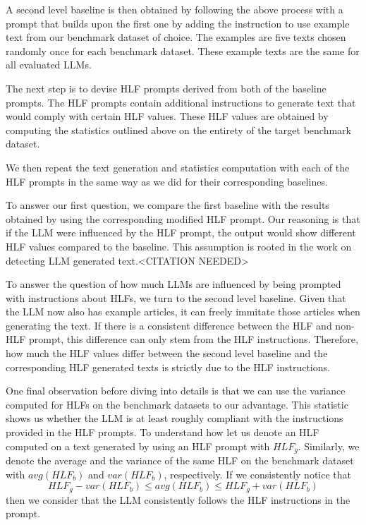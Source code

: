 \documentclass[runningheads,a4paper,11pt]{article}
\begin{document}
A second level baseline is then obtained by following the above process with a
prompt that builds upon the first one by adding the instruction to use example
text from our benchmark dataset of choice.
The examples are five texts chosen randomly once for each benchmark dataset.
These example texts are the same for all evaluated LLMs.

The next step is to devise HLF prompts derived from both of the baseline
prompts.
The HLF prompts contain additional instructions to generate text that would
comply with certain HLF values.
These HLF values are obtained by computing the statistics outlined above on
the entirety of the target benchmark dataset.

We then repeat the text generation and statistics computation with each of the
HLF prompts in the same way as we did for their corresponding baselines.

To answer our first question, we compare the first baseline with the results
obtained by using the corresponding modified HLF prompt.
Our reasoning is that if the LLM were influenced by the HLF prompt, the output
would show different HLF values compared to the baseline.
This assumption is rooted in the work on detecting LLM generated text.<CITATION NEEDED>

To answer the question of how much LLMs are influenced by being prompted with
instructions about HLFs, we turn to the second level baseline.
Given that the LLM now also has example articles, it can freely immitate those
articles when generating the text.
If there is a consistent difference between the HLF and non-HLF prompt, this
difference can only stem from the HLF instructions.
Therefore, how much the HLF values differ between the second level baseline and
the corresponding HLF generated texts is strictly due to the HLF instructions.

One final observation before diving into details is that we can use the variance
computed for HLFs on the benchmark datasets to our advantage.
This statistic shows us whether the LLM is at least roughly compliant with the
instructions provided in the HLF prompts.
To understand how let us denote an HLF computed on a text generated by using an
HLF prompt with $HLF_g$.
Similarly, we denote the average and the variance of the same HLF on the
benchmark dataset with $avg(HLF_b)$ and $var(HLF_b)$, respectively.
If we consistently notice that
    \[HLF_g - var(HLF_b) \leq avg(HLF_b) \leq HLF_g + var(HLF_b)\]
then we consider that the LLM consistently follows the HLF instructions in the
prompt.
\end{document}
